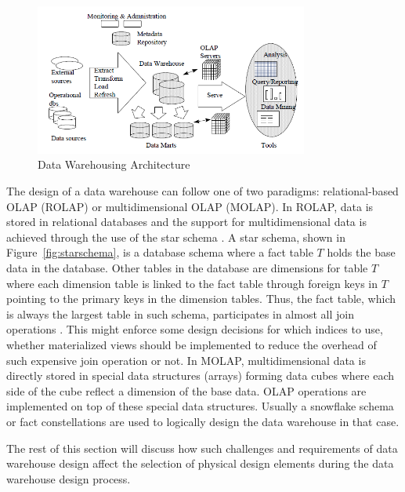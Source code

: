 \documentclass[12pt,a4paper]{article}
\begin{document}
\begin{figure}[!t]
\centering
\includegraphics[width=9cm]{figs/dw.png}
\caption{Data Warehousing Architecture \cite{chaudhuri1997overview}}
\label{fig:dw}
\end{figure}

The design of a data warehouse can follow one of two paradigms: relational-based OLAP (ROLAP) or multidimensional OLAP (MOLAP). In ROLAP, data is stored in
relational databases and the support for multidimensional data is achieved through the use of the star schema \cite{cheung2001towards}. A star schema,
shown in Figure~\ref{fig:starschema}, is a database schema where a fact table $T$ holds the base data in the database. Other tables in the database are
dimensions for
table $T$ where each dimension table is linked to the fact table through foreign keys in $T$ pointing to the primary keys in the dimension tables. Thus, the
fact table, which is always the largest table in such schema, participates in almost all join operations \cite{datta2002parallel}. This might enforce some
design decisions for which indices to use, whether materialized views should be implemented to reduce the overhead of such expensive join operation or not. In
MOLAP, multidimensional data is directly stored in special data structures (arrays) forming data cubes where each side of the cube reflect a dimension of the
base data. OLAP operations are implemented on top of these special data structures. Usually a snowflake schema \cite{kimball2009data} or fact constellations are
used to logically design the data warehouse in that case.

The rest of this section will discuss how such challenges and requirements of data warehouse design affect the selection of physical design elements during the
data warehouse design process.
\end{document}
